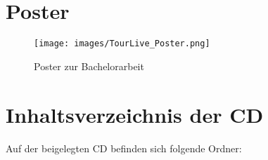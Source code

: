 \newpage
\section{Poster}
\begin{figure}[H]
	\centering
	\texttt{[image: images/TourLive\_Poster.png]}
	\caption{Poster zur Bachelorarbeit}
\end{figure}

\newpage
\section{Inhaltsverzeichnis der CD}
Auf der beigelegten CD befinden sich folgende Ordner:
%


